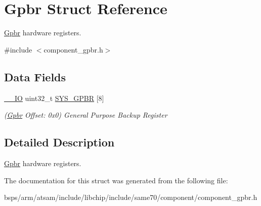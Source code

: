 \hypertarget{structGpbr}{}\section{Gpbr Struct Reference}
\label{structGpbr}


\mbox{\hyperlink{structGpbr}{Gpbr}} hardware registers.  




{\ttfamily \#include $<$component\+\_\+gpbr.\+h$>$}

\subsection*{Data Fields}
\begin{DoxyCompactItemize}
\item 
\mbox{\label{structGpbr_aa01a5319f53bc5a7f7c04c04ce9678b5}} 
\mbox{\hyperlink{core__cm7_8h_aec43007d9998a0a0e01faede4133d6be}{\+\_\+\+\_\+\+IO}} uint32\+\_\+t \mbox{\hyperlink{structGpbr_aa01a5319f53bc5a7f7c04c04ce9678b5}{S\+Y\+S\+\_\+\+G\+P\+BR}} \mbox{[}8\mbox{]}
\begin{DoxyCompactList}\small\item\em (\mbox{\hyperlink{structGpbr}{Gpbr}} Offset\+: 0x0) General Purpose Backup Register \end{DoxyCompactList}\end{DoxyCompactItemize}


\subsection{Detailed Description}
\mbox{\hyperlink{structGpbr}{Gpbr}} hardware registers. 

The documentation for this struct was generated from the following file\+:\begin{DoxyCompactItemize}
\item 
bsps/arm/atsam/include/libchip/include/same70/component/component\+\_\+gpbr.\+h\end{DoxyCompactItemize}
